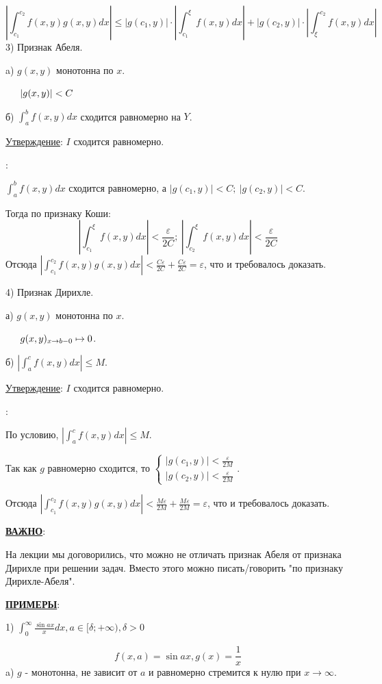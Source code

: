 \documentclass[12pt]{article}
\begin{document}
$$|\int_{c_1}^{c_2} f(x,y) g(x,y) dx|\leq |g(c_1,y)| \cdot |\int_{c_1}^{\xi} f(x,y) dx| + |g(c_2,y) | \cdot |\int_{\xi}^{c_2} f(x,y)dx|$$
3) Признак Абеля.\par
a) $g(x,y)$ монотонна по $x$.\par
$\indent |g(x,y)|<C$\par
б) $\int_a^b f(x,y) dx$ сходится равномерно на $Y$.\par
\uline{Утверждение}: $I$ сходится равномерно.\par
{}:\par
$\int_a^b f(x,y)dx$ сходится равномерно, а $|g(c_1,y)| < C; \ |g(c_2,y)| < C$.\par
Тогда по признаку Коши:
$$|\int_{c_1}^{\xi} f(x,y)dx| < \frac{\varepsilon}{2C}; \ |\int_{c_2}^{\xi} f(x,y)dx| < \frac{\varepsilon}{2C}$$
Отсюда $|\int_{c_1}^{c_2} f(x,y)g(x,y) dx| < \frac {C \varepsilon}{2C} + \frac {C \varepsilon}{2C} = \varepsilon$, что и требовалось доказать.\par
4) Признак Дирихле.\par
а) $g(x,y)$ монотонна по $x$.\par
$\indent g(x,y)_{x \to b-0} \mapsto 0$.\par
б) $|\int_a^c f(x,y) dx| \leq M$.\par
\uline{Утверждение}: $I$ сходится равномерно.\par
{}:\par
По условию, $|\int_a^c f(x,y) dx| \leq M$.\par
Так как $g$ равномерно сходится, то $\begin{cases} |g(c_1, y)| < \frac{\varepsilon}{2M} \\ |g(c_2, y)| < \frac{\varepsilon}{2M} \end{cases}$.\par
Отсюда $|\int_{c_1}^{c_2} f(x,y)g(x,y) dx| < \frac {M \varepsilon}{2M} + \frac {M \varepsilon}{2M} = \varepsilon$, что и требовалось доказать.\par
\uline{\textbf{ВАЖНО}}:\par
На лекции мы договорились, что можно не отличать признак Абеля от признака Дирихле при решении задач. Вместо этого можно писать/говорить "по признаку Дирихле-Абеля".\par
\uline{\textbf{ПРИМЕРЫ}}:\par
1) $\int_{0}^{\infty} \frac{\sin{ax}}{x} dx, a \in [\delta; +\infty), \delta > 0$\par
$$f(x,a) = \sin{ax}, g(x) = \frac{1}{x}$$
a) $g$ - монотонна, не зависит от $a$ и равномерно стремится к нулю при $x \to \infty$.\par
\end{document}
